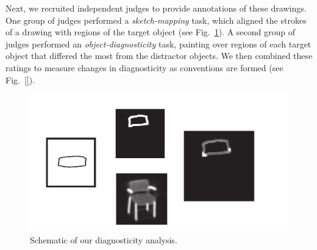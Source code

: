 \documentclass[11pt,letterpaper]{article}
\begin{document}
Next, we recruited independent judges to provide annotations of these drawings. 
One group of judges performed a \emph{sketch-mapping} task, which aligned the strokes of a drawing with regions of the target object (see Fig.~\ref{fig:diagnosticity_schema}).
A second group of judges performed an \emph{object-diagnosticity} task, painting over regions of each target object that differed the most from the distractor objects.
We then combined these ratings to measure changes in diagnosticity as conventions are formed (see Fig.~\ref{}).


\begin{figure}[b!]
\includegraphics[width=\linewidth]{figures/diagnosticity.pdf}
\centering
\caption{Schematic of our diagnosticity analysis.}
\label{fig:diagnosticity_schema}
\end{figure}



\end{document}

